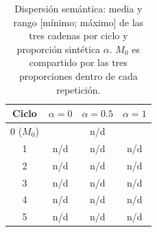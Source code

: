 
\begin{table}[ht]
\centering
\footnotesize
\begin{tabular}{c c c c}
\hline
Ciclo & $\alpha=0$ & $\alpha=0.5$ & $\alpha=1$ \\
\hline
0 ($M_0$) & \multicolumn{3}{c}{n/d} \\
1 & n/d & n/d & n/d \\
2 & n/d & n/d & n/d \\
3 & n/d & n/d & n/d \\
4 & n/d & n/d & n/d \\
5 & n/d & n/d & n/d \\
\hline
\end{tabular}
\caption{Dispersión semántica: media y rango [mínimo; máximo] de las tres cadenas por ciclo y proporción sintética $\alpha$. $M_0$ es compartido por las tres proporciones dentro de cada repetición.}
\label{tab:medias_semantic_dispersion}
\end{table}
